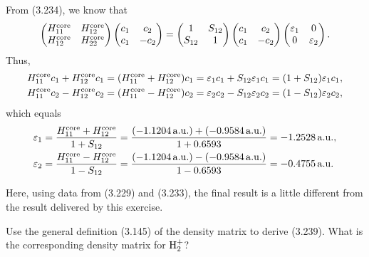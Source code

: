 \documentclass[a4paper]{book}
\newcounter{exercise}[chapter]
\newcounter{solution}[chapter]
\newcommand{\core}{{\rm core}}
\newcommand{\au}{{\rm a.u.}}
\begin{document}
	\begin{solution}
	
	From (3.234), we know that
	\[
		\begin{pmatrix}
			H^\core_{11} & H^\core_{12} \\ H^\core_{12} & H^\core_{22}
		\end{pmatrix} \begin{pmatrix}
			c_1 & c_2 \\ c_1 & -c_2 
		\end{pmatrix} = \begin{pmatrix}
			1 & S_{12} \\ S_{12} & 1 
		\end{pmatrix} \begin{pmatrix}
			c_1 & c_2 \\ c_1 & -c_2 
		\end{pmatrix} \begin{pmatrix}
			\varepsilon_1 & 0 \\ 0 & \varepsilon_2
		\end{pmatrix} .
	\]
	Thus,
	\begin{align*}
		H^\core_{11} c_1 + H^\core_{12} c_1 &= ( H^\core_{11} + H^\core_{12} ) c_1 = \varepsilon_1 c_1 + S_{12} \varepsilon_1 c_1 = ( 1 + S_{12} ) \varepsilon_1 c_1 , \\
		H^\core_{11} c_2 - H^\core_{12} c_2 &= ( H^\core_{11} - H^\core_{12} ) c_2 = \varepsilon_2 c_2 - S_{12} \varepsilon_2 c_2 = ( 1 - S_{12} ) \varepsilon_2 c_2 ,
	\end{align*}
	which equals
	\begin{align*}
		\varepsilon_1 &= \frac{ H^\core_{11} + H^\core_{12} }{ 1 + S_{12} } = \frac{ ( -1.1204 \, \au ) + ( -0.9584 \, \au ) }{ 1 + 0.6593 } = -1.2528  \, \au , \\
		\varepsilon_2 &= \frac{ H^\core_{11} - H^\core_{12} }{ 1 - S_{12} } = \frac{ ( -1.1204 \, \au ) - ( -0.9584 \, \au ) }{ 1 - 0.6593 } = -0.4755 \, \au 
	\end{align*}
	
	Here, using data from (3.229) and (3.233), the final result is a little different from the result delivered by this exercise.
	
	\end{solution}
	
	\begin{exercise}
	Use the general definition (3.145) of the density matrix to derive (3.239). What is the corresponding density matrix for ${\rm H}^+_2$?
	\end{exercise}
	
\end{document}
